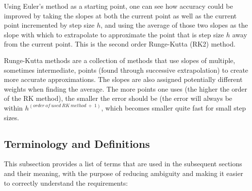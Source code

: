 \documentclass[12pt]{article}
\begin{document}
Using Euler's method as a starting point, one can see how accuracy could be 
improved by 
taking the slopes at both the current point as well as the current point 
incremented by step 
size $h$, and using the average of those two slopes as the slope with which to 
extrapolate to approximate the point that is step size $h$ away from the 
current 
point. This is the second order Runge-Kutta (RK2) method.

Runge-Kutta methods are a collection of methods that use slopes of multiple, 
sometimes intermediate, points (found through successive extrapolation) to 
create more accurate approximations. The slopes are also assigned potentially 
different weights when finding the average. The more points one uses (the 
higher the order of the RK method), the smaller the error should be (the error 
will always be within $h^{(order\ of\ used\ RK\ method\ +\ 1)}$, which becomes
smaller quite fast for small step sizes.

\subsection{Terminology and  Definitions}

This subsection provides a list of terms that are used in the subsequent
sections and their meaning, with the purpose of reducing ambiguity and making it
easier to correctly understand the requirements:
\end{document}
